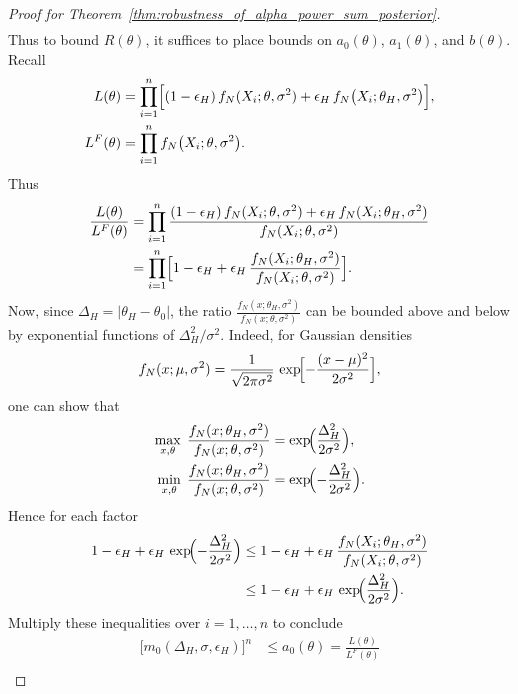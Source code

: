 \documentclass[12pt]{article}
\begin{document}
\begin{proof}[Proof for Theorem~\ref{thm:robustness_of_alpha_power_sum_posterior}]
\begin{align*}
    \end{align*}
    Thus to bound $R(\theta)$, it suffices to place bounds on $a_0(\theta)$, $a_1(\theta)$, and $b(\theta)$.
    Recall
    \begin{align*}
        L(\theta) &= \prod_{i=1}^n\Bigl[(1-\epsilon_H)\,f_N(X_i;\theta,\sigma^2) + \epsilon_H\,f_N\bigl(X_i;\theta_H,\sigma^2\bigr)\Bigr], \\
        L^F(\theta) &= \prod_{i=1}^n f_N\bigl(X_i;\theta,\sigma^2\bigr).
    \end{align*}
    Thus
    \begin{align*}
        \frac{L(\theta)}{L^F(\theta)} &= \prod_{i=1}^n\frac{(1-\epsilon_H)\,f_N(X_i;\theta,\sigma^2) + \epsilon_H\,f_N(X_i;\theta_H,\sigma^2)}{f_N(X_i;\theta,\sigma^2)} \\
        &= \prod_{i=1}^n\Bigl[1 - \epsilon_H + \epsilon_H\, \frac{f_N(X_i;\theta_H,\sigma^2)}{f_N(X_i;\theta,\sigma^2)}\Bigr].
    \end{align*}
    Now, since $\Delta_H = |\theta_H-\theta_0|$, the ratio $\frac{f_N(x;\theta_H,\sigma^2)}{f_N(x;\theta,\sigma^2)}$ can be bounded above and below by exponential functions of $\Delta_H^2/\sigma^2$.
    Indeed, for Gaussian densities
    \begin{align*}
        f_N(x;\mu,\sigma^2) = \frac{1}{\sqrt{2\pi\sigma^2}}\,\exp\!\Bigl[-\frac{(x-\mu)^2}{2\sigma^2}\Bigr],
    \end{align*}
    one can show that
    \begin{align*}
        \max_{x,\theta}\;\frac{f_N(x;\theta_H,\sigma^2)}{f_N(x;\theta,\sigma^2)} &= \exp\!\Bigl(\frac{\Delta_H^2}{2\sigma^2}\Bigr), \\
        \min_{x,\theta}\;\frac{f_N(x;\theta_H,\sigma^2)}{f_N(x;\theta,\sigma^2)} &= \exp\!\Bigl(-\frac{\Delta_H^2}{2\sigma^2}\Bigr).
    \end{align*}
    Hence for each factor
    \begin{align*}
        1 - \epsilon_H + \epsilon_H\,\exp\!\Bigl(-\frac{\Delta_H^2}{2\sigma^2}\Bigr) &\leq 1 - \epsilon_H + \epsilon_H\, \frac{f_N(X_i;\theta_H,\sigma^2)}{f_N(X_i;\theta,\sigma^2)} \\
        &\leq 1 - \epsilon_H + \epsilon_H\,\exp\!\Bigl(\frac{\Delta_H^2}{2\sigma^2}\Bigr).
    \end{align*}
    Multiply these inequalities over $i=1,\dots,n$ to conclude
    \begin{align*}
         \bigl[m_0(\Delta_H,\sigma,\epsilon_H)\bigr]^n &\leq a_0(\theta) = \frac{L(\theta)}{L^F(\theta)} \\

\end{align*}
\end{proof}
\end{document}
